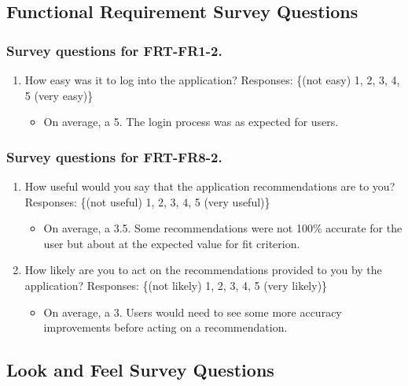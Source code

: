 \documentclass[12pt, titlepage]{article}
\begin{document}
\subsection{Functional Requirement Survey Questions}
\subsubsection{Survey questions for \textbf{FRT-FR1-2}.}

\begin{enumerate}
\item How easy was it to log into the application?
Responses: \{(not easy) 1, 2, 3, 4, 5 (very easy)\} \\
  \begin{itemize}
    \item On average, a 5. The login process was as expected for users.
  \end{itemize}
\end{enumerate}

\subsubsection{Survey questions for \textbf{FRT-FR8-2}.}

\begin{enumerate}
  \item How useful would you say that the application recommendations are to you?
  Responses: \{(not useful) 1, 2, 3, 4, 5 (very useful)\} \\
    \begin{itemize}
      \item On average, a 3.5. Some recommendations were not 100\% accurate for the user but about at the
      expected value for fit criterion.
    \end{itemize}
  \item How likely are you to act on the recommendations provided to you by the application?
  Responses: \{(not likely) 1, 2, 3, 4, 5 (very likely)\}
    \begin{itemize}
      \item On average, a 3. Users would need to see some more accuracy improvements before acting on a recommendation.
    \end{itemize}
\end{enumerate}

\subsection{Look and Feel Survey Questions}
\end{document}
